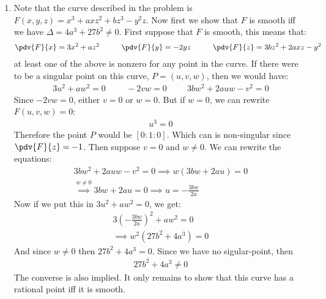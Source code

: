 \begin{enumerate}[label=]
    \item 
        Note that the curve described in the problem is $F(x, y, z) = x^3 + axz^2 + bz^3 - y^2z$. Now first we show that $F$ is smooth iff we have $\Delta = 4a^3 + 27 b^2 \ne 0$. First suppose that $F$ is smooth, this means that:
        \begin{gather*}
                \pdv{F}{x} = 3x^2 + az^2 \hspace{1cm}
                \pdv{F}{y} = -2yz \hspace{1cm}
                \pdv{F}{z} = 3bz^2 + 2axz - y^2 
        \end{gather*}
        at least one of the above is nonzero for any point in the curve.
        If there were to be a singular point on this curve, $P = (u, v, w)$, then we would have:
        \begin{gather*}
                3u^2 + aw^2 = 0 \hspace{1cm}
                -2vw = 0 \hspace{1cm} 
                3bw^2 + 2auw - v^2 = 0
        \end{gather*}
        Since $-2vw = 0$, either $v = 0$ or $w = 0$. But if $w = 0$, we can rewrite $F(u, v, w) = 0$:
        \begin{gather*}
                u^3 = 0
        \end{gather*}
        Therefore the point $P$ would be $[0: 1: 0]$. Which can is non-singular since $\pdv{F}{z} = -1$. Then suppose $v = 0$ and $w \ne 0$. We can rewrite the equations:
        \begin{gather*}
                3bw^2 + 2auw - v^2 = 0 \implies w(3bw + 2au) = 0 \\
                \overset{w \ne 0}{\implies} 3bw + 2au = 0 \implies u = - \frac{3bw}{2a}
        \end{gather*}
        Now if we put this in $3u^2 + aw^2 = 0$, we get:
        \begin{gather*}
                3 (-\frac{3bw}{2a})^2 + aw^2 = 0 \\
                \implies w^2(27b^2 + 4a^3) = 0 
        \end{gather*}
        And since $w \ne 0$ then $27b^2 + 4a^3 = 0$. Since we have no sigular-point, then 
        \begin{gather*}
                27b^2 + 4a^3 \ne 0
        \end{gather*}
        The converse is also implied. It only remains to show that this curve has a rational point iff it is smooth.
\end{enumerate}